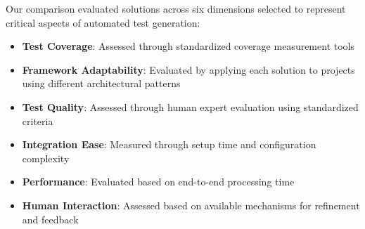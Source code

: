 Our comparison evaluated solutions across six dimensions selected to represent critical aspects of automated test generation:

\begin{itemize}
    \item \textbf{Test Coverage}: Assessed through standardized coverage measurement tools
    \item \textbf{Framework Adaptability}: Evaluated by applying each solution to projects using different architectural patterns
    \item \textbf{Test Quality}: Assessed through human expert evaluation using standardized criteria
    \item \textbf{Integration Ease}: Measured through setup time and configuration complexity
    \item \textbf{Performance}: Evaluated based on end-to-end processing time
    \item \textbf{Human Interaction}: Assessed based on available mechanisms for refinement and feedback
\end{itemize}

\begin{table}[ht]
    \centering
    \caption{Comparison of Test Generation Approaches}
\end{table}

